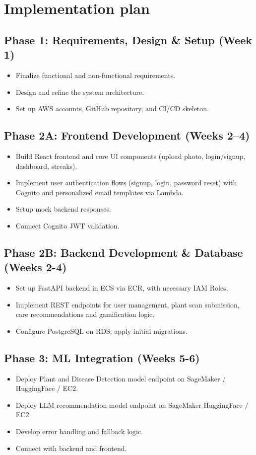 \documentclass[11pt]{article}
\begin{document}
\section{Implementation plan}
\subsection*{Phase 1: Requirements, Design \& Setup (Week 1)}
\begin{itemize}
    \item Finalize functional and non-functional requirements.
    \item Design and refine the system architecture.
    \item Set up AWS accounts, GitHub repository, and CI/CD skeleton.
\end{itemize}

\subsection*{Phase 2A: Frontend Development (Weeks 2–4)}
\begin{itemize}
    \item Build React frontend and core UI components (upload photo, login/signup, dashboard, streaks).
    \item Implement user authentication flows (signup, login, password reset) with Cognito and personalized email templates via Lambda.  
    \item Setup mock backend responses.
    \item Connect Cognito JWT validation.
\end{itemize}

\subsection*{Phase 2B: Backend Development \& Database (Weeks 2-4)}
\begin{itemize}
    \item Set up FastAPI backend in ECS via ECR, with necessary IAM Roles.
    \item Implement REST endpoints for user management, plant scan submission, care recommendations and gamification logic.
    \item Configure PostgreSQL on RDS; apply initial migrations.
\end{itemize}

\subsection*{Phase 3: ML Integration (Weeks 5-6)}
\begin{itemize}
    \item Deploy Plant and Disease Detection model endpoint on SageMaker / HuggingFace / EC2.
    \item Deploy LLM recommendation model endpoint on SageMaker HuggingFace / EC2.
    \item Develop error handling and fallback logic.
    \item Connect with backend and frontend.
\end{itemize}
\end{document}
